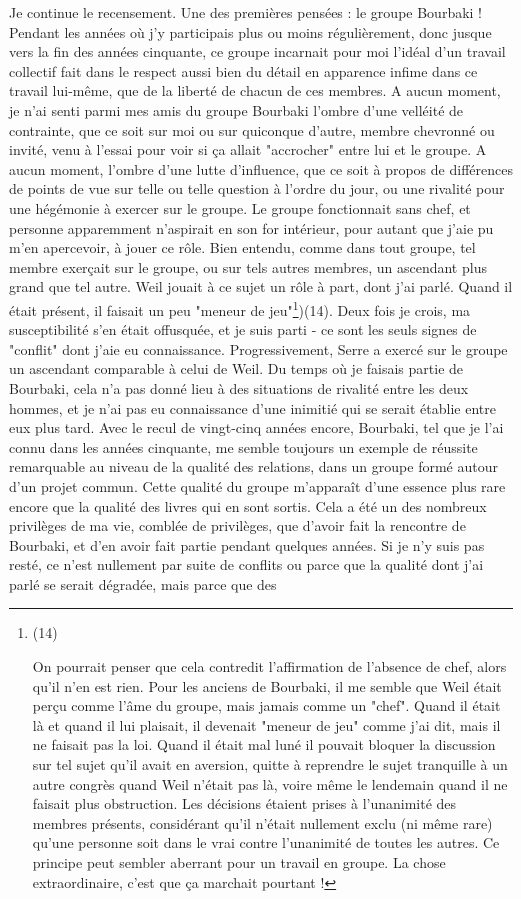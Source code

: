 Je continue le recensement. Une des premières pensées : le groupe Bourbaki ! Pendant les années où j'y participais plus ou moins régulièrement, donc jusque vers la fin des années cinquante, ce groupe incarnait pour moi l'idéal d'un travail collectif fait dans le respect aussi bien du détail en apparence infime dans ce travail lui-même, que de la liberté de chacun de ces membres. A aucun moment, je n'ai senti parmi mes amis du groupe Bourbaki l'ombre d'une velléité de contrainte, que ce soit sur moi ou sur quiconque d'autre, membre chevronné ou invité, venu à l'essai pour voir si ça allait "accrocher" entre lui et le groupe. A aucun moment, l'ombre d'une lutte d'influence, que ce soit à propos de différences de points de vue sur telle ou telle question à l'ordre du jour, ou une rivalité pour une hégémonie à exercer sur le groupe. Le groupe fonctionnait sans chef, et personne apparemment n'aspirait en son for intérieur, pour autant que j'aie pu m'en apercevoir, à jouer ce rôle. Bien entendu, comme dans tout groupe, tel membre exerçait sur le groupe, ou sur tels autres membres, un ascendant plus grand que tel autre. Weil jouait à ce sujet un rôle à part, dont j'ai parlé. Quand il était présent, il faisait un peu "meneur de jeu"\footnote{(14)\par On pourrait penser que cela contredit l'affirmation de l'absence de chef, alors qu'il n'en est rien. Pour les anciens de Bourbaki, il me semble que Weil était perçu comme l'âme du groupe, mais jamais comme un "chef". Quand il était là et quand il lui plaisait, il devenait "meneur de jeu" comme j'ai dit, mais il ne faisait pas la loi. Quand il était mal luné il pouvait bloquer la discussion sur tel sujet qu'il avait en aversion, quitte à reprendre le sujet tranquille à un autre congrès quand Weil n'était pas là, voire même le lendemain quand il ne faisait plus obstruction. Les décisions étaient prises à l'unanimité des membres présents, considérant qu'il n'était nullement exclu (ni même rare) qu'une personne soit dans le vrai contre l'unanimité de toutes les autres. Ce principe peut sembler aberrant pour un travail en groupe. La chose extraordinaire, c'est que ça marchait pourtant !})(14). Deux fois je crois, ma susceptibilité s'en était offusquée, et je suis parti - ce sont les seuls signes de "conflit" dont j'aie eu connaissance. Progressivement, Serre a exercé sur le groupe un ascendant comparable à celui de Weil. Du temps où je faisais partie de Bourbaki, cela n'a pas donné lieu à des situations de rivalité entre les deux hommes, et je n'ai pas eu connaissance d'une inimitié qui se serait établie entre eux plus tard. Avec le recul de vingt-cinq années encore, Bourbaki, tel que je l'ai connu dans les années cinquante, me semble toujours un exemple de réussite remarquable au niveau de la qualité des relations, dans un groupe formé autour d'un projet commun. Cette qualité du groupe m'apparaît d'une essence plus rare encore que la qualité des livres qui en sont sortis. Cela a été un des nombreux privilèges de ma vie, comblée de privilèges, que d'avoir fait la rencontre de Bourbaki, et d'en avoir fait partie pendant quelques années. Si je n'y suis pas resté, ce n'est nullement par suite de conflits ou parce que la qualité dont j'ai parlé se serait dégradée, mais parce que des 